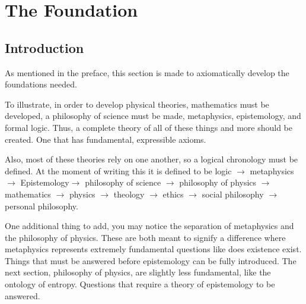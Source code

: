 \part{The Foundation}
\chapter{Introduction}
As mentioned in the preface, this section is made to axiomatically develop the foundations needed. 

To illustrate, in order to develop physical theories, mathematics must be developed, a philosophy of science must be made, metaphysics, epistemology, and formal logic. Thus, a complete theory of all of these things and more should be created. One that has fundamental, expressible axioms. 

Also, most of these theories rely on one another, so a logical chronology must be defined. At the moment of writing this it is defined to be logic $\to$ metaphysics $\to$ Epistemology$\to$ philosophy of science $\to$
philosophy of physics $\to$ mathematics $\to$ physics $\to$  theology $\to$ ethics $\to$ social philosophy $\to$ personal philosophy.

One additional thing to add, you may notice the separation of metaphysics and the philosophy of physics. These are both meant to signify a difference where metaphysics represents extremely fundamental questions like does existence exist. Things that must be answered before epistemology can be fully introduced. The next section, philosophy of physics, are slightly less fundamental, like the ontology of entropy. Questions that require a theory of epistemology to be answered. 

